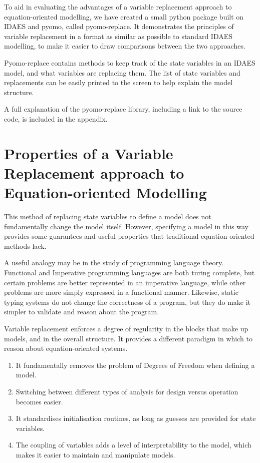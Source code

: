 To aid in evaluating the advantages of a variable replacement approach
to equation-oriented modelling, we have created a small python package
built on IDAES and pyomo, called pyomo-replace. It demonstrates the
principles of variable replacement in a format as similar as possible to
standard IDAES modelling, to make it easier to draw comparisons between
the two approaches.

Pyomo-replace contains methods to keep track of the state variables in
an IDAES model, and what variables are replacing them. The list of state
variables and replacements can be easily printed to the screen to help
explain the model structure.

A full explanation of the pyomo-replace library, including a link to the
source code, is included in the appendix.

\hypertarget{properties-of-a-variable-replacement-approach-to-equation-oriented-modelling}{%
\section{Properties of a Variable Replacement approach to
Equation-oriented
Modelling}\label{properties-of-a-variable-replacement-approach-to-equation-oriented-modelling}}

This method of replacing state variables to define a model does not
fundamentally change the model itself. However, specifying a model in
this way provides some guarantees and useful properties that traditional
equation-oriented methods lack.

A useful analogy may be in the study of programming language theory.
Functional and Imperative programming languages are both turing
complete, but certain problems are better represented in an imperative
language, while other problems are more simply expressed in a functional
manner. Likewise, static typing systems do not change the correctness of
a program, but they do make it simpler to validate and reason about the
program.

Variable replacement enforces a degree of regularity in the blocks that
make up models, and in the overall structure. It provides a different
paradigm in which to reason about equation-oriented systems.

\begin{enumerate}
\def\labelenumi{\arabic{enumi}.}
\tightlist
\item
  It fundamentally removes the problem of Degrees of Freedom when
  defining a model.
\item
  Switching between different types of analysis for design versus
  operation becomes easier.
\item
  It standardises initialisation routines, as long as guesses are
  provided for state variables.
\item
  The coupling of variables adds a level of interpretability to the
  model, which makes it easier to maintain and manipulate models.
\end{enumerate}

